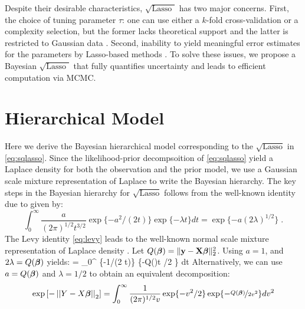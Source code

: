 \documentclass[chapters]{uamaththesis}
\def\sql{$\sqrt{\text{Lasso }}$}
\begin{document}
Despite their desirable characteristics, \sql{} has two major concerns. First, the choice of tuning parameter $\tau$: one can use either a $k$-fold cross-validation or a complexity selection, but the former lacks theoretical support and the latter is restricted to Gaussian data \citep{giraud2012high}. Second, inability to yield meaningful error estimates for the parameters by Lasso-based methods \citep{chatterjee2011bootstrap}. To solve these issues, we propose a Bayesian \sql{} that fully quantifies uncertainty and leads to efficient computation via MCMC.
\section{Hierarchical Model}
Here we derive the Bayesian hierarchical model corresponding to the $\sqrt{\text{Lasso}}$ in \eqref{eq:sqlasso}. Since the likelihood-prior decompsoition of \eqref{eq:sqlasso} yield a Laplace density for both the observation and the prior model, we use a Gaussian scale mixture representation of Laplace to write the Bayesian hierarchy. The key steps in the Bayesian hierarchy for $\sqrt{\text{Lasso}}$ follows from the well-known identity due to \citet{levy1940certains} given by:
\begin{equation}
  \int_{0}^{\infty} \frac{a}{(2 \pi)^{1/2} t^{3/2}} \exp\{-{a^2}/({2 t})\} \exp\{-\lambda t\} dt = \exp\{-a (2 \lambda)^{1/2} \} \;.\label{eq:levy}
\end{equation}
The Levy identity \eqref{eq:levy} leads to the  well-known normal scale mixture representation of Laplace density \citep{andrews_scale_1974}. Let $Q(\boldsymbol{\beta})= \lVert{\bf y} - {\bf X} \boldsymbol{\beta}\rVert_2^2$. Using $a = 1$, and $2\lambda = Q(\boldsymbol{\beta})$ yields:
\beq
\exp {} = \int_{0}^{\infty}  \exp\{-{1}/({2 t})\} \exp\{-Q(\bbeta)t /2 \} dt \label{eq:t_i}
\eeq
Alternatively, we can use $a = Q(\boldsymbol{\beta})$ and $\lambda = 1/2$ to obtain an equivalent decomposition:
\begin{equation}
\exp \left[-\left|\left|Y - X\boldsymbol{\beta}\right|\right|_2 \right] = \int_{0}^{\infty} \frac{1}{(2 \pi)^{1/2} v} \exp\{-{v^2}/{2}\} \exp\{- \nicefrac{Q(\boldsymbol{\beta})}{2v^2}\} dv^2 \label{eq:v_i}
\end{equation}
\end{document}
